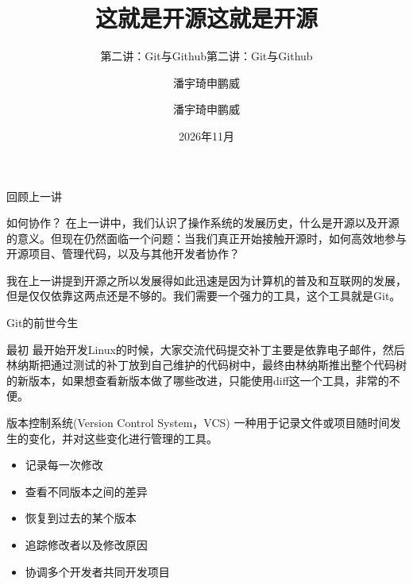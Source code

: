 \documentclass[aspectratio=169]{beamer}
\title{这就是开源}
\subtitle{第二讲：Git与Github}
\author{潘宇琦\hspace*{1em}申鹏威}
\begin{document}
\begin{frame}
	\title{这就是开源}
	\subtitle{第二讲：Git与Github}
	\author{潘宇琦\hspace*{1em}申鹏威}
	\date{2026年11月}
	\titlepage
\end{frame}	
	
\begin{frame}{回顾上一讲}
\begin{block}{如何协作？}
	\hspace*{2em}在上一讲中，我们认识了操作系统的发展历史，什么是开源以及开源的意义。但现在仍然面临一个问题：当我们真正开始接触开源时，如何高效地参与开源项目、管理代码，以及与其他开发者协作？
	
	\hspace*{2em}我在上一讲提到开源之所以发展得如此迅速是因为计算机的普及和互联网的发展，但是仅仅依靠这两点还是不够的。我们需要一个强力的工具，这个工具就是Git。
\end{block}
\end{frame}	

\begin{frame}{Git的前世今生}
\begin{block}{最初}
	\hspace*{2em}最开始开发Linux的时候，大家交流代码提交补丁主要是依靠电子邮件，然后林纳斯把通过测试的补丁放到自己维护的代码树中，最终由林纳斯推出整个代码树的新版本，如果想查看新版本做了哪些改进，只能使用diff这一个工具，非常的不便。
\end{block}
\begin{block}{版本控制系统(Version Control System，VCS)}
	\hspace*{2em}一种用于记录文件或项目随时间发生的变化，并对这些变化进行管理的工具。
	\begin{itemize}
		\item 记录每一次修改
		\item 查看不同版本之间的差异
		\item 恢复到过去的某个版本
		\item 追踪修改者以及修改原因
		\item 协调多个开发者共同开发项目
	\end{itemize}
\end{block}
\end{frame}
\end{document}
